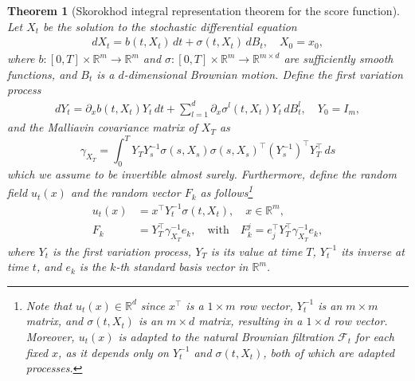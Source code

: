 \documentclass[]{interact}
\newcommand{\1}{\mathbf{1}}
\theoremstyle{plain}%
\newtheorem{theorem}{Theorem}[section]
\theoremstyle{definition}
\theoremstyle{remark}
\numberwithin{equation}{section}
\begin{document}
\begin{theorem}[Skorokhod integral representation theorem for the score function]
\label{thm:main}
Let \(X_t\) be the solution to the stochastic differential equation
\begin{align*}
dX_t = b(t, X_t) \, dt + \sigma(t, X_t) \, dB_t, \quad X_0 = x_0,
\end{align*}
where \(b: [0, T] \times \mathbb{R}^m \to \mathbb{R}^m\) and \(\sigma: [0, T] \times \mathbb{R}^m \to \mathbb{R}^{m \times d}\) are sufficiently smooth functions, and \(B_t\) is a \(d\)-dimensional Brownian motion. Define the first variation process
\begin{align*}
dY_t = \partial_x b(t, X_t) Y_t \, dt + \sum_{l=1}^d \partial_x \sigma^l(t, X_t) Y_t \, dB_t^l, \quad Y_0 = I_m,
\end{align*}
and the Malliavin covariance matrix of $X_T$ as 
\begin{equation*}
 \gamma_{X_T} = \int_0^T Y_T Y_s^{-1} \sigma(s, X_s) \sigma(s, X_s)^\top (Y_s^{-1})^\top Y_T^\top \, ds
\end{equation*}
which we assume to be invertible almost surely. Furthermore, define 
the random field \( u_t(x) \) and the random vector \( F_k \) as follows\footnote{Note that \( u_t(x) \in \mathbb{R}^d \) since \( x^\top \) is a \( 1 \times m \) row vector, \( Y_t^{-1} \) is an \( m \times m \) matrix, and \( \sigma(t, X_t) \) is an \( m \times d \) matrix, resulting in a \( 1 \times d \) row vector. Moreover, \( u_t(x) \) is adapted to the natural Brownian filtration \( \mathcal{F}_t \) for each fixed \( x \), as it depends only on \( Y_t^{-1} \) and \( \sigma(t, X_t) \), both of which are adapted processes.}
\begin{align*}
u_t(x) &= x^\top Y_t^{-1} \sigma(t, X_t), \quad x \in \mathbb{R}^m, \\
F_k &= Y_T^\top \gamma_{X_T}^{-1} e_k, \quad \text{with} \quad F_k^j = e_j^\top Y_T^\top \gamma_{X_T}^{-1} e_k,
\end{align*}
where \( Y_t \) is the first variation process, \( Y_T \) is its value at time \( T \), \( Y_t^{-1} \) its inverse at time \( t \), and \( e_k \) is the \( k \)-th standard  basis vector in \( \mathbb{R}^m \).
%

\end{theorem}
\end{document}
